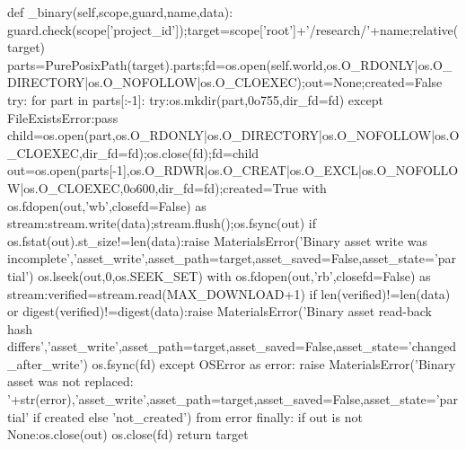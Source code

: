     def _binary(self,scope,guard,name,data):
        guard.check(scope['project_id']);target=scope['root']+'/research/'+name;relative(target)
        parts=PurePosixPath(target).parts;fd=os.open(self.world,os.O_RDONLY|os.O_DIRECTORY|os.O_NOFOLLOW|os.O_CLOEXEC);out=None;created=False
        try:
            for part in parts[:-1]:
                try:os.mkdir(part,0o755,dir_fd=fd)
                except FileExistsError:pass
                child=os.open(part,os.O_RDONLY|os.O_DIRECTORY|os.O_NOFOLLOW|os.O_CLOEXEC,dir_fd=fd);os.close(fd);fd=child
            out=os.open(parts[-1],os.O_RDWR|os.O_CREAT|os.O_EXCL|os.O_NOFOLLOW|os.O_CLOEXEC,0o600,dir_fd=fd);created=True
            with os.fdopen(out,'wb',closefd=False) as stream:stream.write(data);stream.flush();os.fsync(out)
            if os.fstat(out).st_size!=len(data):raise MaterialsError('Binary asset write was incomplete','asset_write',asset_path=target,asset_saved=False,asset_state='partial')
            os.lseek(out,0,os.SEEK_SET)
            with os.fdopen(out,'rb',closefd=False) as stream:verified=stream.read(MAX_DOWNLOAD+1)
            if len(verified)!=len(data) or digest(verified)!=digest(data):raise MaterialsError('Binary asset read-back hash differs','asset_write',asset_path=target,asset_saved=False,asset_state='changed_after_write')
            os.fsync(fd)
        except OSError as error:
            raise MaterialsError('Binary asset was not replaced: '+str(error),'asset_write',asset_path=target,asset_saved=False,asset_state='partial' if created else 'not_created') from error
        finally:
            if out is not None:os.close(out)
            os.close(fd)
        return target

